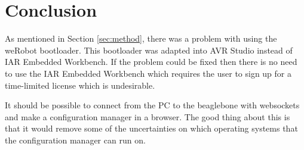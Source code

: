 \section{Conclusion}\label{sec:conclusion}
As mentioned in Section \ref{sec:method}, there was a problem with using the weRobot bootloader. This bootloader was adapted into AVR Studio instead of IAR Embedded Workbench. If the problem could be fixed then there is no need to use the IAR Embedded Workbench which requires the user to sign up for a time-limited license which is undesirable.

It should be possible to connect from the PC to the beaglebone with websockets and make a configuration manager in a browser. The good thing about this is that it would remove some of the uncertainties on which operating systems that the configuration manager can run on. 



